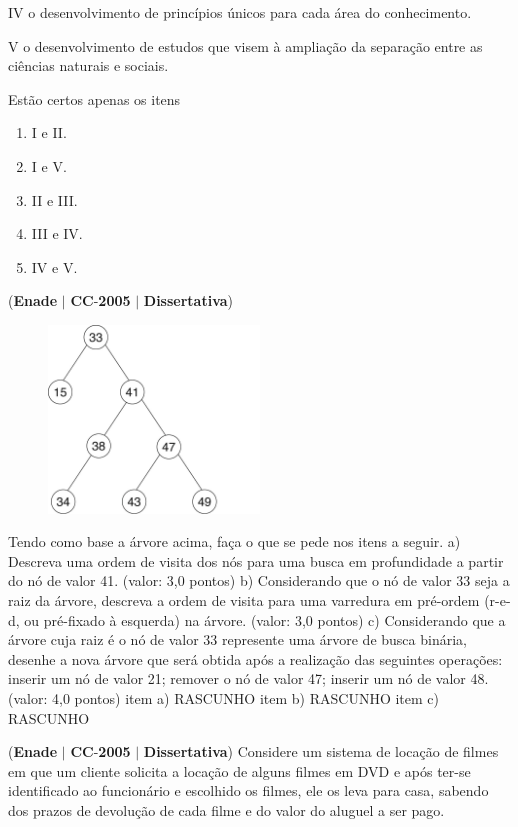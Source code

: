 \documentclass{exam}
\begin{document}
\begin{questions}
IV o desenvolvimento de princípios únicos para cada área do
conhecimento.

V o desenvolvimento de estudos que visem à ampliação da
separação entre as ciências naturais e sociais.

Estão certos apenas os itens
	\begin{enumerate}[label=\alph*)]
		\item  I e II.
		\item  I e V.
		\item  II e III.
		\item  III e IV.
		\item  IV e V.
	\end{enumerate}

\question (\textbf{Enade} $|$ \textbf{CC}-\textbf{2005} $|$ \textbf{Dissertativa})

\begin{figure}[H]
	\begin{center}
		\includegraphics[width=0.5\textwidth]{CIENCIA_DA_COMPUTACAO_Prova2005-utf8_figuras/fig-0015.jpg}
	\end{center}
\end{figure}
Tendo como base a árvore acima, faça o que se pede nos itens a seguir.
a) Descreva uma ordem de visita dos nós para uma busca em profundidade a partir do nó de valor 41. (valor: 3,0 pontos)
b) Considerando que o nó de valor 33 seja a raiz da árvore, descreva a ordem de visita para uma varredura em pré-ordem
(r-e-d, ou pré-fixado à esquerda) na árvore. (valor: 3,0 pontos)
c) Considerando que a árvore cuja raiz é o nó de valor 33 represente uma árvore de busca binária, desenhe a nova árvore que será
obtida após a realização das seguintes operações: inserir um nó de valor 21; remover o nó de valor 47; inserir um nó de valor 48.
(valor: 4,0 pontos)
item a) RASCUNHO
item b) RASCUNHO
item c) RASCUNHO

\question (\textbf{Enade} $|$ \textbf{CC}-\textbf{2005} $|$ \textbf{Dissertativa})
Considere um sistema de locação de filmes em que um cliente solicita a locação de alguns filmes em DVD e após ter-se
identificado ao funcionário e escolhido os filmes, ele os leva para casa, sabendo dos prazos de devolução de cada filme e do
valor do aluguel a ser pago.


\end{questions}
\end{document}
